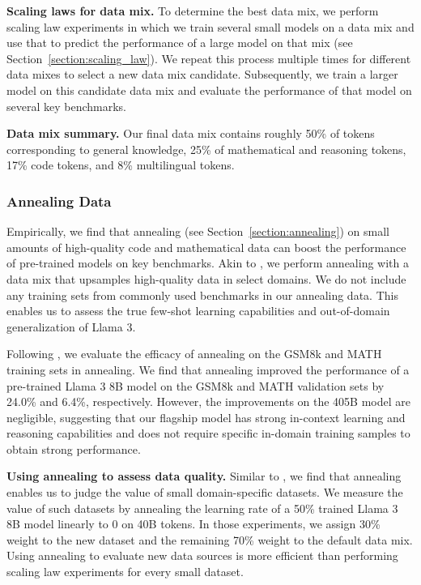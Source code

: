 \textbf{Scaling laws for data mix.}
To determine the best data mix, we perform scaling law experiments in which we train several small models on a data mix and use that to predict the performance of a large model on that mix (see Section~\ref{section:scaling_law}).
We repeat this process multiple times for different data mixes to select a new data mix candidate.
Subsequently, we train a larger model on this candidate data mix and evaluate the performance of that model on several key benchmarks.

\textbf{Data mix summary.}
Our final data mix contains roughly 50\% of tokens corresponding to general knowledge, 25\% of mathematical and reasoning tokens, 17\% code tokens, and 8\% multilingual tokens.

\subsubsection{Annealing Data}
\label{sec:annealing_data}
Empirically, we find that annealing (see Section~\ref{section:annealing}) on small amounts of high-quality code and mathematical data can boost the performance of pre-trained models on key benchmarks.
Akin to \citet{li2024datacomplmsearchgenerationtraining}, we perform annealing with a data mix that upsamples high-quality data in select domains.
We do not include any training sets from commonly used benchmarks in our annealing data.
This enables us to assess the true few-shot learning capabilities and out-of-domain generalization of Llama 3.

Following \citet{openai2023gpt4}, we evaluate the efficacy of annealing on the GSM8k \citep{cobbe2021training} and MATH \citep{hendrycks2021measuring} training sets in annealing. 
We find that annealing improved the performance of a pre-trained Llama 3 8B model on the GSM8k and MATH validation sets by 24.0\% and 6.4\%, respectively.
However, the improvements on the 405B model are negligible, suggesting that our flagship model has strong in-context learning and reasoning capabilities and does not require specific in-domain training samples to obtain strong performance. 

\textbf{Using annealing to assess data quality.}
Similar to \citet{blakeney2024doesdatasparkjoy}, we find that annealing enables us to judge the value of small domain-specific datasets.
We measure the value of such datasets by annealing the learning rate of a 50\% trained Llama 3 8B model linearly to 0 on 40B tokens. 
In those experiments, we assign 30\% weight to the new dataset and the remaining 70\% weight to the default data mix.
Using annealing to evaluate new data sources is more efficient than performing scaling law experiments for every small dataset.
